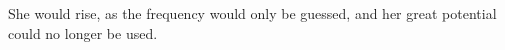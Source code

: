 She would rise, as the frequency would only be guessed, and her great potential could no longer be used.